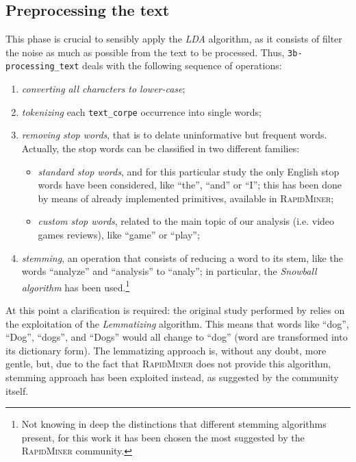 \documentclass[a4paper]{article}
\begin{document}
	 	\subsection{Preprocessing the text}
	 		This phase is crucial to sensibly apply the \emph{LDA} algorithm, as it consists of filter the noise as much as possible from the text to be processed. Thus, \verb*|3b-processing_text| deals with the following sequence of operations:
	 		\begin{enumerate}
	 			\item \emph{converting all characters to lower-case};
	 			\item \emph{tokenizing} each \verb*|text_corpe| occurrence into single words;
	 			\item \emph{removing stop words}, that is to delate uninformative but frequent words. Actually, the stop words can be classified in two different families:
	 			\begin{itemize}
	 				\item \emph{standard stop words}, and for this particular study the only English stop words have been considered, like ``the'', ``and'' or ``I''; this has been done by means of already implemented primitives, available in \textsc{RapidMiner};
	 				\item \emph{custom stop words}, related to the main topic of our analysis (i.e. video games reviews), like ``game'' or ``play'';
	 			\end{itemize}
 				\item \emph{stemming}, an operation that consists of reducing a word to its stem, like the words ``analyze'' and ``analysis'' to ``analy''; in particular, the \emph{Snowball algorithm} has been used.\footnote{Not knowing in deep the distinctions that different stemming algorithms present, for this work it has been chosen the most suggested by the \textsc{RapidMiner} community.}
	 		\end{enumerate}
 			At this point a clarification is required: the original study performed by \citeauthor{article:muller} relies on the exploitation of the \emph{Lemmatizing} algorithm. This means that words like ``dog'', ``Dog'', ``dogs'', and ``Dogs'' would all change to ``dog'' (word are transformed into its dictionary form). The lemmatizing approach is, without any doubt, more gentle, but, due to the fact that \textsc{RapidMiner} does not provide this algorithm, stemming approach has been exploited instead, as suggested by the community itself. 
	 		
\end{document}
